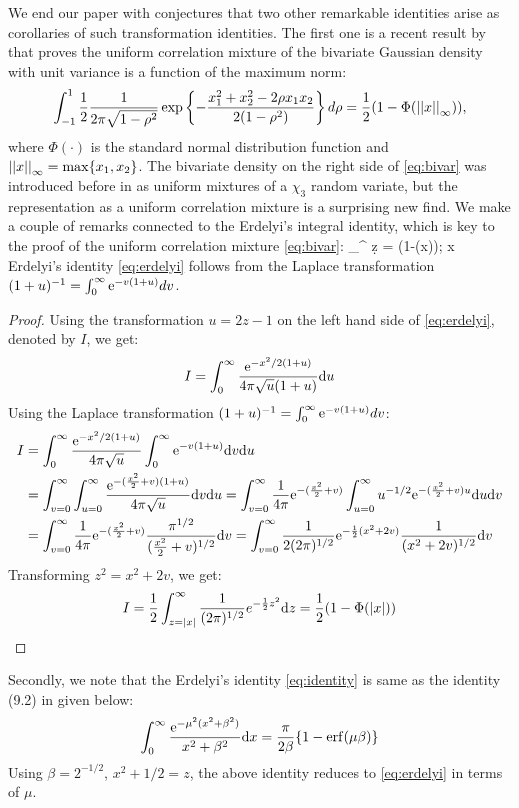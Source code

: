 \documentclass[lineno]{biometrika}
\begin{document}
We end our paper with conjectures that two other remarkable identities arise as corollaries of such transformation identities. The first one is a recent result by \cite{zhang2014uniform} that proves the uniform correlation mixture of the bivariate Gaussian density with unit variance is a function of the maximum norm: 
\begin{equation}
  \int_{-1}^{1} \half \frac{1}{2\pi\sqrt{1-\rho^2}} \exp \left\{ - \frac{x_1^2 + x_2^2 - 2 \rho x_1 x_2}{2(1-\rho^2)} \right\} d \rho = 
  \half (1- \Phi(\vectornorm{x}_{\infty})) \label{eq:bivar}, 
\end{equation}
where $\Phi(\cdot)$ is the standard normal distribution function and $\left|\left|x\right|\right|_{\infty} = \max \{ x_1, x_2\}$. The bivariate density on the right side of \eqref{eq:bivar} was introduced before in \cite{bryson1982constructing} as uniform mixtures of a $\chi_3$ random variate, but the representation as a uniform correlation mixture is a surprising new find. We make a couple of remarks connected to the Erdelyi's integral identity, which is key to the proof of the uniform correlation mixture \eqref{eq:bivar}: 
\beq
\int_{\half}^{\infty}  \d z = \half (1-\Phi(x)); x  \label{eq:erdelyi}
\eeq
Erdelyi's identity \eqref{eq:erdelyi} follows from the Laplace transformation $(1+u)^{-1} = \int_0^{\infty} {\rm e}^{-v(1+u)} dv$. 
\begin{proof}
Using the transformation $ u = 2z-1$ on the left hand side of \eqref{eq:erdelyi}, denoted by $I$, we get: 
$$
I = \int_{0}^{\infty} \frac{{\rm e}^{-x^2/2(1+u)}}{4 \pi \sqrt{u} (1+u)} {\rm d} u
$$
Using the Laplace transformation $(1+u)^{-1} = \int_0^{\infty} {\rm e}^{-v(1+u)} dv$: 
\begin{align*}
I & = \int_{0}^{\infty} \frac{{\rm e}^{-x^2/2(1+u)}}{4 \pi \sqrt{u}} \int_0^{\infty} {\rm e}^{-v(1+u)} {\rm d} v {\rm d} u \\
& = \int_{v= 0}^{\infty} \int_{u=0}^{\infty} \frac{{\rm e}^{-(\frac{x^2}{2} + v)(1+u)}}{4 \pi \sqrt{u}} {\rm d} v {\rm d} u = \int_{v= 0}^{\infty} \frac{1}{4\pi} {\rm e}^{-(\frac{x^2}{2} + v)} \int_{u=0}^{\infty} u^{-1/2} {\rm e}^{-(\frac{x^2}{2} + v) u} {\rm d} u {\rm d} v \\
& = \int_{v= 0}^{\infty} \frac{1}{4\pi} {\rm e}^{-(\frac{x^2}{2} + v)} \frac{\pi^{1/2}}{(\frac{x^2}{2} + v)^{1/2}} {\rm d} v = \int_{v= 0}^{\infty} \frac{1}{2 (2\pi)^{1/2}} {\rm e}^{-\frac{1}{2}(x^2 + 2v)} \frac{1}{(x^2+ 2v)^{1/2}} {\rm d} v
\end{align*}
Transforming $z^2 = x^2 + 2v$, we get: 
$$
I =\frac{1}{2}  \int_{z = |x|}^{\infty} \frac{1}{(2\pi)^{1/2}} e^{-\frac{1}{2} z^2} {\rm d} z = \frac{1}{2} (1 - \Phi(|x|)) 
$$
\end{proof}
Secondly, we note that the Erdelyi's identity \eqref{eq:identity} is same as the identity (9.2) in \citep{amdeberhan2010cauchy} given below: 
$$
\int_0^{\infty}\frac{{\rm e}^{-\mu^2(x^2+\beta^2)}}{x^2+\beta^2} {\rm d} x = \frac{\pi}{2 \beta} \{ 1 - {\rm erf}(\mu \beta) \} 
$$
Using $\beta = 2^{-1/2}$, $x^2+1/2 = z$, the above identity reduces to \eqref{eq:erdelyi} in terms of $\mu$. 
\end{document}
